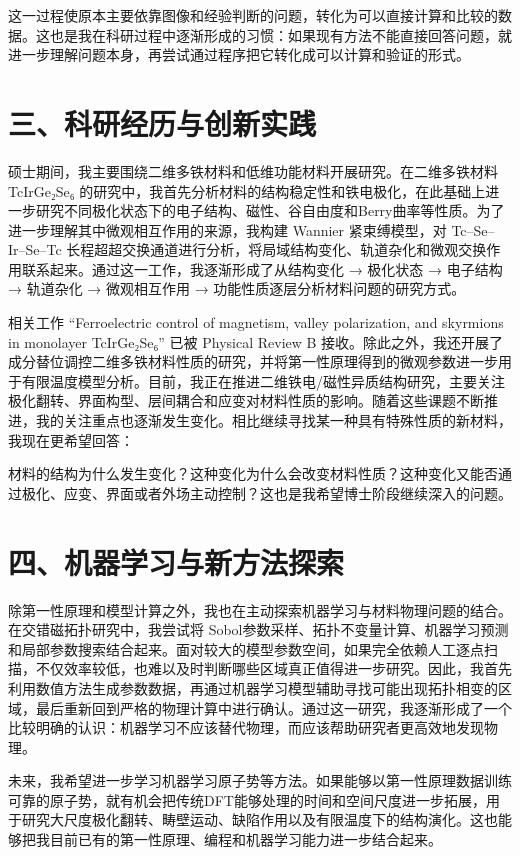 这一过程使原本主要依靠图像和经验判断的问题，转化为可以直接计算和比较的数据。这也是我在科研过程中逐渐形成的习惯：如果现有方法不能直接回答问题，就进一步理解问题本身，再尝试通过程序把它转化成可以计算和验证的形式。

\section{三、科研经历与创新实践}

硕士期间，我主要围绕二维多铁材料和低维功能材料开展研究。在二维多铁材料 TcIrGe₂Se₆ 的研究中，我首先分析材料的结构稳定性和铁电极化，在此基础上进一步研究不同极化状态下的电子结构、磁性、谷自由度和Berry曲率等性质。为了进一步理解其中微观相互作用的来源，我构建 Wannier 紧束缚模型，对 Tc–Se–Ir–Se–Tc 长程超超交换通道进行分析，将局域结构变化、轨道杂化和微观交换作用联系起来。通过这一工作，我逐渐形成了从结构变化 → 极化状态 → 电子结构 → 轨道杂化 → 微观相互作用 → 功能性质逐层分析材料问题的研究方式。

相关工作 “Ferroelectric control of magnetism, valley polarization, and skyrmions in monolayer TcIrGe₂Se₆” 已被 Physical Review B 接收。除此之外，我还开展了成分替位调控二维多铁材料性质的研究，并将第一性原理得到的微观参数进一步用于有限温度模型分析。目前，我正在推进二维铁电/磁性异质结构研究，主要关注极化翻转、界面构型、层间耦合和应变对材料性质的影响。随着这些课题不断推进，我的关注重点也逐渐发生变化。相比继续寻找某一种具有特殊性质的新材料，我现在更希望回答：

材料的结构为什么发生变化？这种变化为什么会改变材料性质？这种变化又能否通过极化、应变、界面或者外场主动控制？这也是我希望博士阶段继续深入的问题。

\section{四、机器学习与新方法探索}

除第一性原理和模型计算之外，我也在主动探索机器学习与材料物理问题的结合。在交错磁拓扑研究中，我尝试将 Sobol参数采样、拓扑不变量计算、机器学习预测和局部参数搜索结合起来。面对较大的模型参数空间，如果完全依赖人工逐点扫描，不仅效率较低，也难以及时判断哪些区域真正值得进一步研究。因此，我首先利用数值方法生成参数数据，再通过机器学习模型辅助寻找可能出现拓扑相变的区域，最后重新回到严格的物理计算中进行确认。通过这一研究，我逐渐形成了一个比较明确的认识：机器学习不应该替代物理，而应该帮助研究者更高效地发现物理。

未来，我希望进一步学习机器学习原子势等方法。如果能够以第一性原理数据训练可靠的原子势，就有机会把传统DFT能够处理的时间和空间尺度进一步拓展，用于研究大尺度极化翻转、畴壁运动、缺陷作用以及有限温度下的结构演化。这也能够把我目前已有的第一性原理、编程和机器学习能力进一步结合起来。

